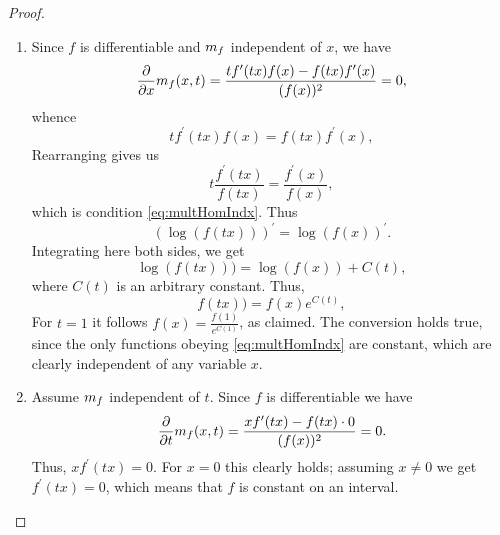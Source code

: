 \documentclass[10pt,a4paper]{amsart}
\newcommand{\mh}{\textsc{m}}
\begin{document}
\begin{proof} 
\begin{enumerate}
    \item 
    Since $f$ is differentiable and $\mh_f$ independent of $x$, we have
    \begin{equation*}
\frac{\partial}{\partial x} \mh_f(x,t) = 
\frac{t f^\prime (tx) f(x) - f(tx) f^\prime (x)}{(f(x))^2}
=0,
\end{equation*}
whence
\begin{equation*}
t f^\prime (tx) f(x) = f(tx) f^\prime (x),
\end{equation*}
Rearranging gives us
\begin{equation*}
t \frac{f^\prime (tx)}{f(tx)}  =
\frac{f^\prime (x)}{f(x)},
\end{equation*}
which is condition \eqref{eq:multHomIndx}.
Thus
\begin{equation*}
(\log(f(tx)))^\prime = \log(f (x))^\prime.
\end{equation*}
Integrating here both sides, we get
\begin{equation*}
\log(f(tx))) = \log(f(x)) + C(t),
\end{equation*}
where $C(t)$ is an arbitrary constant.
Thus,
\begin{equation*}
f(tx)) = f(x)  e^{C(t)},
\end{equation*}
For $t=1$ it follows $f(x)=\frac{f(1)}{e^{C(1)}}$, as claimed.
The conversion holds true,
since the only functions obeying \eqref{eq:multHomIndx} are constant, which are clearly independent of any variable $x$.

  \item 
Assume $\mh_f$ independent of $t$.
Since $f$ is differentiable we have
    \begin{equation*}
\frac{\partial}{\partial t} \mh_f(x,t) = 
\frac{x f^\prime (tx) - f(tx) \cdot 0}{(f(x))^2}
=0.
\end{equation*}
Thus, $x f^\prime (tx) =0$.
For $x=0$ this clearly holds;
assuming $x \neq 0$ 
we get $f^\prime (tx) =0$,
which means that $f$ is constant on an interval.
\end{enumerate} 
\end{proof}
\end{document}
